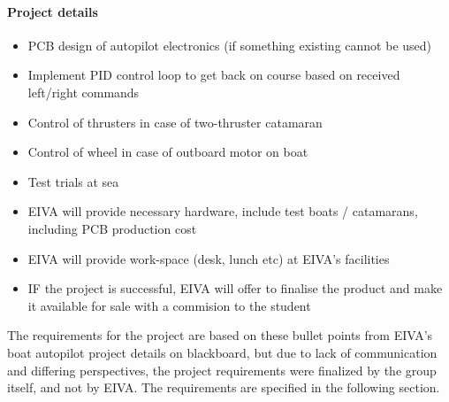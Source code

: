 \paragraph{Project details}
\begin{itemize}
\item PCB design of autopilot electronics (if something existing cannot be used)
\item Implement PID control loop to get back on course based on received left/right commands
\item Control of thrusters in case of two-thruster catamaran
\item Control of wheel in case of outboard motor on boat
\item Test trials at sea
\item EIVA will provide necessary hardware, include test boats / catamarans, including PCB production cost
\item EIVA will provide work-space (desk, lunch etc) at EIVA's facilities
\item IF the project is successful, EIVA will offer to finalise the product and make it available for sale with a commision to the student
\end{itemize}

The requirements for the project are based on these bullet points from EIVA's boat autopilot project details on blackboard, but due to lack of communication and differing perspectives, the project requirements were finalized by the group itself, and not by EIVA. The requirements are specified in the following section.
